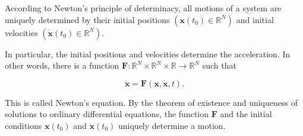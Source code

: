 According to Newton's principle of determinacy, all motions of a system are uniquely determined by their initial positions $(\mathbf{x}(t_0) \in \mathbb{R}^N)$ and initial velocities $(\dot{\mathbf{x}}(t_0) \in \mathbb{R}^N)$.

In particular, the initial positions and velocities determine the acceleration. In other words, there is a function $\mathbf{F}: \mathbb{R}^N \times \mathbb{R}^N \times \mathbb{R} \rightarrow \mathbb{R}^N$ such that

$$\ddot{\mathbf{x}} = \mathbf{F}(\mathbf{x}, \dot{\mathbf{x}}, t).$$

This is called Newton's equation. By the theorem of existence and uniqueness of solutions to ordinary differential equations, the function $\mathbf{F}$ and the initial conditions $\mathbf{x}(t_0)$ and $\dot{\mathbf{x}}(t_0)$ uniquely determine a motion.
